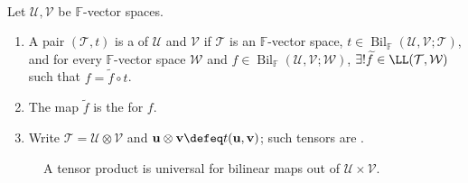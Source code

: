 \begin{definition} \label{def:tensor-product-universal-property} \\
Let $\mathcal{U},\mathcal{V}$ be $\mathbb{F}$-vector spaces.
\begin{enumerate}[label=(\roman*)]
\setlength{\itemsep}{0pt}
\item A pair $(\mathcal{T},t)$ is a  of $\mathcal{U}$ and $\mathcal{V}$ if $\mathcal{T}$ is an $\mathbb{F}$-vector space, $t\in\operatorname{Bil}_{\mathbb{F}}(\mathcal{U},\mathcal{V};\mathcal{T})$, and for every $\mathbb{F}$-vector space $\mathcal{W}$ and $f\in\operatorname{Bil}_{\mathbb{F}}(\mathcal{U},\mathcal{V};\mathcal{W})$, $\exists!\widetilde{f}\in\LL(\mathcal{T},\mathcal{W})$ such that $f=\widetilde{f}\circ t$.
\item The map $\widetilde{f}$ is the  for $f$.
\item Write $\mathcal{T}=\mathcal{U}\otimes\mathcal{V}$ and $\mathbf{u}\otimes\mathbf{v}\defeq t(\mathbf{u},\mathbf{v})$; such tensors are .
\end{enumerate}
\end{definition}

\begin{figure}[H]
  \centering
  
  \caption{A tensor product is universal for bilinear maps out of $\mathcal{U}\times\mathcal{V}$.}
  \label{fig:tensor-universal-property}
\end{figure}

